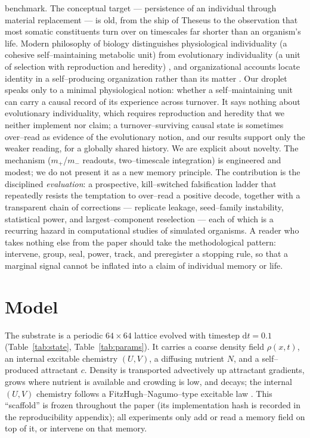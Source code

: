 \documentclass[11pt]{article}
\begin{document}
benchmark. The conceptual target --- persistence of an individual through material replacement --- is old, from the ship of Theseus to the observation that most somatic constituents turn over on timescales far shorter than an organism's life. Modern philosophy of biology distinguishes physiological individuality (a cohesive self--maintaining metabolic unit) from evolutionary individuality (a unit of selection with reproduction and heredity) \citep{godfreysmith2009}, and organizational accounts locate identity in a self--producing organization rather than its matter \citep{varela1974,maturana1980}. Our droplet speaks only to a minimal physiological notion: whether a self--maintaining unit can carry a causal record of its experience across turnover. It says nothing about evolutionary individuality, which requires reproduction and heredity that we neither implement nor claim; a turnover--surviving causal state is sometimes over--read as evidence of the evolutionary notion, and our results support only the weaker reading, for a globally shared history. We are explicit about novelty. The mechanism ($m_+$/$m_-$ readouts, two--timescale integration) is engineered and modest; we do not present it as a new memory principle. The contribution is the disciplined \emph{evaluation}: a prospective, kill--switched falsification ladder that repeatedly resists the temptation to over--read a positive decode, together with a transparent chain of corrections --- replicate leakage, seed--family instability, statistical power, and largest--component reselection --- each of which is a recurring hazard in computational studies of simulated organisms. A reader who takes nothing else from the paper should take the methodological pattern: intervene, group, seal, power, track, and preregister a stopping rule, so that a marginal signal cannot be inflated into a claim of individual memory or life.

\section{Model}
\label{sec:model}
The substrate is a periodic $64\times64$ lattice evolved with timestep $\mathrm{d}t=0.1$ (Table~\ref{tab:state},
Table~\ref{tab:params}). It carries a coarse density field $\rho(x,t)$, an internal excitable chemistry $(U,V)$, a
diffusing nutrient $N$, and a self--produced attractant $c$. Density is transported advectively up attractant
gradients, grows where nutrient is available and crowding is low, and decays; the internal $(U,V)$ chemistry follows
a FitzHugh--Nagumo--type excitable law \citep{fitzhugh1961,nagumo1962}. This ``scaffold'' is frozen throughout the
paper (its implementation hash is recorded in the reproducibility appendix); all experiments only add or read a
memory field on top of it, or intervene on that memory.
\end{document}
